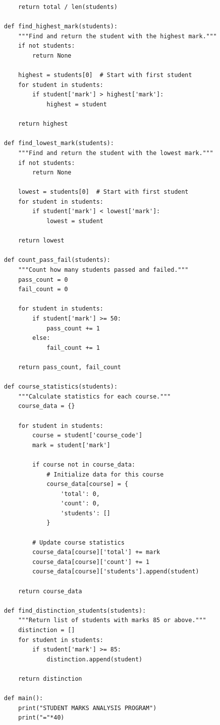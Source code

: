 \documentclass[a4paper,11pt]{article}
\theoremstyle{mytheor}
\begin{document}
\begin{lstlisting}
    return total / len(students)

def find_highest_mark(students):
    """Find and return the student with the highest mark."""
    if not students:
        return None
    
    highest = students[0]  # Start with first student
    for student in students:
        if student['mark'] > highest['mark']:
            highest = student
    
    return highest

def find_lowest_mark(students):
    """Find and return the student with the lowest mark."""
    if not students:
        return None
    
    lowest = students[0]  # Start with first student
    for student in students:
        if student['mark'] < lowest['mark']:
            lowest = student
    
    return lowest

def count_pass_fail(students):
    """Count how many students passed and failed."""
    pass_count = 0
    fail_count = 0
    
    for student in students:
        if student['mark'] >= 50:
            pass_count += 1
        else:
            fail_count += 1
    
    return pass_count, fail_count

def course_statistics(students):
    """Calculate statistics for each course."""
    course_data = {}
    
    for student in students:
        course = student['course_code']
        mark = student['mark']
        
        if course not in course_data:
            # Initialize data for this course
            course_data[course] = {
                'total': 0,
                'count': 0,
                'students': []
            }
        
        # Update course statistics
        course_data[course]['total'] += mark
        course_data[course]['count'] += 1
        course_data[course]['students'].append(student)
    
    return course_data

def find_distinction_students(students):
    """Return list of students with marks 85 or above."""
    distinction = []
    for student in students:
        if student['mark'] >= 85:
            distinction.append(student)
    
    return distinction

def main():
    print("STUDENT MARKS ANALYSIS PROGRAM")
    print("="*40)
    

\end{lstlisting}
\end{document}
